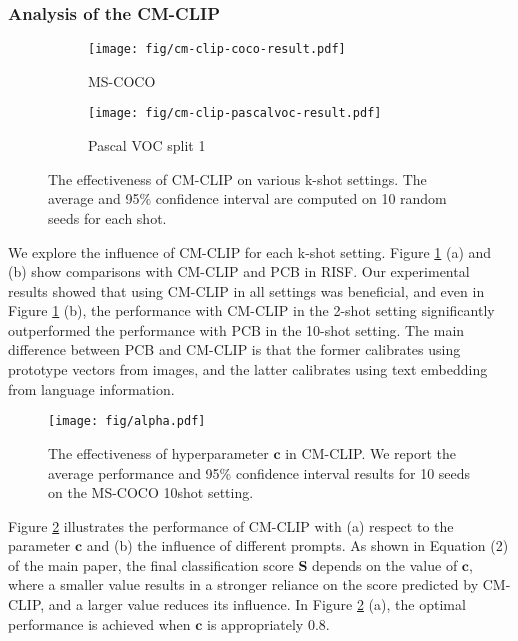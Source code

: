 \documentclass{article}
\begin{document}
\subsubsection{Analysis of the CM-CLIP}

\begin{figure}[h]
    \centering
    \begin{subfigure}[]{0.48\textwidth}
    \texttt{[image: fig/cm-clip-coco-result.pdf]}
    \caption{MS-COCO}
    \end{subfigure}
    \begin{subfigure}[]{0.48\textwidth}
    \texttt{[image: fig/cm-clip-pascalvoc-result.pdf]}
    \caption{Pascal VOC split 1}
    \end{subfigure}
    \caption{The effectiveness of CM-CLIP on various k-shot settings.
    The average and 95$\%$ confidence interval are computed on 10 random seeds for each shot.}
    \label{fig:cm-clip-result}
\end{figure}

We explore the influence of CM-CLIP for each k-shot setting. 
Figure \ref{fig:cm-clip-result} (a) and (b) show comparisons with CM-CLIP and PCB in RISF. 
Our experimental results showed that using CM-CLIP in all settings was beneficial, and even in Figure \ref{fig:cm-clip-result} (b), the performance with CM-CLIP in the 2-shot setting significantly outperformed the performance with PCB in the 10-shot setting. 
The main difference between PCB and CM-CLIP is that the former calibrates using prototype vectors from images, and the latter calibrates using text embedding from language information.

\begin{figure}[h]
    \centering
\texttt{[image: fig/alpha.pdf]}
\caption{The effectiveness of hyperparameter $\mathbf{c}$ in CM-CLIP. We report the average performance and 95\% confidence interval results for 10 seeds on the MS-COCO 10shot setting.}
\label{fig:cmclip}
\end{figure}

Figure \ref{fig:cmclip} illustrates the performance of CM-CLIP with (a) respect to the parameter $\mathbf{c}$ and (b) the influence of different prompts.
As shown in Equation (2) of the main paper, the final classification score $\mathbf{S}$ depends on the value of $\mathbf{c}$, where a smaller value results in a stronger reliance on the score predicted by CM-CLIP, and a larger value reduces its influence.
In Figure \ref{fig:cmclip} (a), the optimal performance is achieved when $\mathbf{c}$ is appropriately 0.8.
\end{document}
